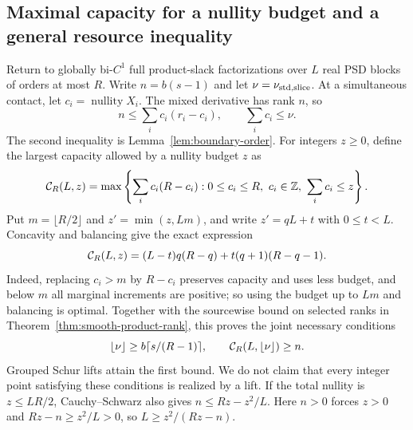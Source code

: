 \subsection{Maximal capacity for a nullity budget and a general resource inequality}
Return to globally bi-$C^1$ full product-slack factorizations over $L$
real PSD blocks of orders at most $R$. Write $n=b(s-1)$ and let
$\nu=\nu_{\mathrm{std},\mathrm{slice}}$. At a simultaneous contact, let $c_i=\operatorname{nullity}X_i$.
The mixed derivative has rank $n$, so
\begin{equation}\label{res:nullity-capacity}
 n\leq\sum_i c_i(r_i-c_i),\qquad \sum_i c_i\leq\nu.
\end{equation}
The second inequality is Lemma~\ref{lem:boundary-order}.
For integers $z\geq0$, define the largest capacity allowed by a nullity
budget $z$ as
\[
 {\cal C}_R(L,z)=\max\left\{\sum_i c_i(R-c_i):
         0\leq c_i\leq R,\ c_i\in\mathbb Z,\ \sum_i c_i\leq z\right\}.
\]
Put $m=\lfloor R/2\rfloor$ and $z'=\min(z,Lm)$, and write $z'=qL+t$ with
$0\leq t<L$. Concavity and balancing give the exact expression
\begin{equation}\label{res:nullity-envelope}
 {\cal C}_R(L,z)=(L-t)q(R-q)+t(q+1)(R-q-1).
\end{equation}
Indeed, replacing $c_i>m$ by $R-c_i$ preserves capacity and uses less
budget, and below $m$ all marginal increments are positive; so using the
budget up to $Lm$ and balancing is optimal. Together with the sourcewise
bound on selected ranks in Theorem~\ref{thm:smooth-product-rank}, this
proves the joint necessary conditions
\begin{equation}\label{res:joint-conditions}
 \lfloor\nu\rfloor\geq b\lceil s/(R-1)\rceil,\qquad
 {\cal C}_R(L,\lfloor\nu\rfloor)\geq n.
\end{equation}
Grouped Schur lifts attain the first bound. We do not claim that every
integer point satisfying these conditions is realized by a lift. If the
total nullity is $z\leq LR/2$, Cauchy--Schwarz also gives
$n\leq Rz-z^2/L$. Here $n>0$ forces $z>0$ and
$Rz-n\geq z^2/L>0$, so $L\geq z^2/(Rz-n)$.

